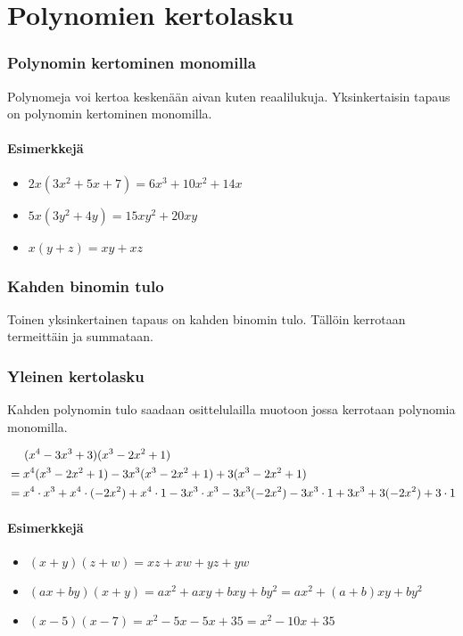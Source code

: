 \chapter{Polynomien kertolasku}

\subsection*{Polynomin kertominen monomilla}

Polynomeja voi kertoa keskenään aivan kuten reaalilukuja. Yksinkertaisin tapaus on polynomin kertominen monomilla.

\subsubsection*{Esimerkkejä}
\begin{itemize}
    \item $2x(3x^2+5x+7) = 6x^3+10x^2+14x$
    \item $5x(3y^2+4y) = 15xy^2+20xy$
    \item $x(y+z) = xy+xz$
\end{itemize}

\subsection*{Kahden binomin tulo}

Toinen yksinkertainen tapaus on kahden binomin tulo. Tällöin kerrotaan termeittäin ja summataan.

\subsection*{Yleinen kertolasku}
Kahden polynomin tulo saadaan osittelulailla muotoon jossa kerrotaan polynomia
monomilla.
\begin{esimerkki}
\begin{align*}
&\hspace{0.5cm}(x^4-3x^3+3)(x^3-2x^2+1) \\
&= x^4 (x^3-2x^2+1) - 3x^3 (x^3-2x^2+1) + 3 (x^3-2x^2+1) \\
&= x^4\cdot x^3 + x^4\cdot (-2x^2)+x^4\cdot 1-3x^3\cdot x^3-3x^3(-2x^2)-3x^3\cdot1+3x^3+3(-2x^2)+3\cdot 1
\end{align*}
\end{esimerkki}


\subsubsection*{Esimerkkejä}
\begin{itemize}
    \item $(x+y)(z+w) = xz+xw+yz+yw$
    \item $(ax+by)(x+y) = ax^2+axy+bxy+by^2 = ax^2+(a+b)xy+by^2$
    \item $(x-5)(x-7) = x^2-5x-5x+35 = x^2-10x+35$
\end{itemize}

